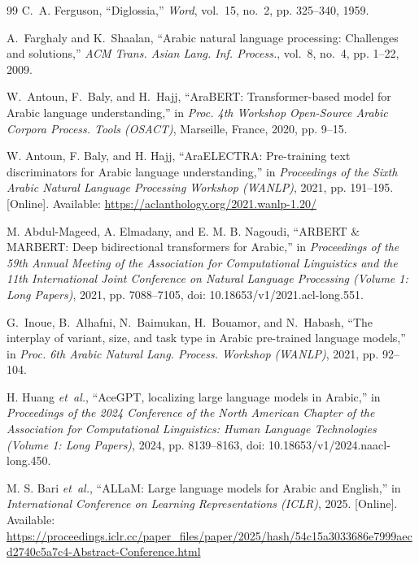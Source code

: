\begin{thebibliography}{99}
\sloppy
{}
C.~A. Ferguson, ``Diglossia,'' \emph{Word}, vol.~15, no.~2, pp. 325--340, 1959.

A.~Farghaly and K.~Shaalan, ``Arabic natural language processing: Challenges and solutions,'' \emph{ACM Trans. Asian Lang. Inf. Process.}, vol.~8, no.~4, pp. 1--22, 2009.

W.~Antoun, F.~Baly, and H.~Hajj, ``AraBERT: Transformer-based model for Arabic language understanding,'' in \emph{Proc. 4th Workshop Open-Source Arabic Corpora Process. Tools (OSACT)}, Marseille, France, 2020, pp. 9--15.

W. Antoun, F. Baly, and H. Hajj, ``{AraELECTRA}: Pre-training text discriminators for {A}rabic language understanding,'' in \emph{Proceedings of the Sixth Arabic Natural Language Processing Workshop (WANLP)}, 2021, pp. 191--195. [Online]. Available: \url{https://aclanthology.org/2021.wanlp-1.20/}

M. Abdul-Mageed, A. Elmadany, and E. M. B. Nagoudi, ``{ARBERT} \& {MARBERT}: Deep bidirectional transformers for {A}rabic,'' in \emph{Proceedings of the 59th Annual Meeting of the Association for Computational Linguistics and the 11th International Joint Conference on Natural Language Processing (Volume 1: Long Papers)}, 2021, pp. 7088--7105, doi: 10.18653/v1/2021.acl-long.551.

G.~Inoue, B.~Alhafni, N.~Baimukan, H.~Bouamor, and N.~Habash, ``The interplay of variant, size, and task type in Arabic pre-trained language models,'' in \emph{Proc. 6th Arabic Natural Lang. Process. Workshop (WANLP)}, 2021, pp. 92--104.

H. Huang \emph{et~al.}, ``{AceGPT}, localizing large language models in {A}rabic,'' in \emph{Proceedings of the 2024 Conference of the North American Chapter of the Association for Computational Linguistics: Human Language Technologies (Volume 1: Long Papers)}, 2024, pp. 8139--8163, doi: 10.18653/v1/2024.naacl-long.450.

M. S. Bari \emph{et~al.}, ``{ALLaM}: Large language models for {A}rabic and {E}nglish,'' in \emph{International Conference on Learning Representations (ICLR)}, 2025. [Online]. Available: \url{https://proceedings.iclr.cc/paper_files/paper/2025/hash/54c15a3033686e7999aecd2740c5a7c4-Abstract-Conference.html}


\end{thebibliography}
